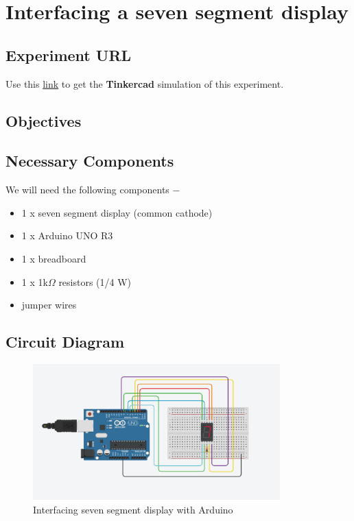\pagebreak\section{Interfacing a seven segment display}
\subsection{Experiment URL}
    Use this \href{https://www.tinkercad.com/things/cBjJt1Np6D3?sharecode=MGQeyKRCp2DAykyyOVjQAholeCilkMIFth6zI349h3c}{link} to get the \textbf{Tinkercad} simulation of this experiment.
    
\subsection{Objectives}


\subsection{Necessary Components}
We will need the following components −
\begin{itemize}
\item 1 x seven segment display (common cathode)
\item 1 x Arduino UNO R3
\item 1 x breadboard
\item 1 x 1k$\Omega$ resistors (1/4 W)
\item jumper wires
\end{itemize}
\subsection{Circuit Diagram}
        \begin{figure}[!h]
            \centering
            \includegraphics[width =0.85\textwidth]{images/seven_segment_display.png}
            \caption{Interfacing seven segment display with Arduino}
        \end{figure}

